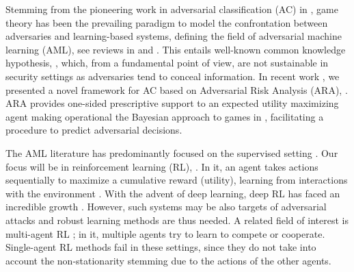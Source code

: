 Stemming from the pioneering work in adversarial classification (AC) in
\parencite{dalvi2004adversarial}, 
 game theory \parencite{menache2011network}
 has been the prevailing paradigm to model the confrontation
between adversaries and learning-based systems, 
defining the field of adversarial machine learning (AML),
 see reviews in 
\parencite{BIGGIO2018317} and \parencite{doi:10.1002/widm.1259}. This entails
well-known common
knowledge hypothesis, \parencite{hargreaves2004game}, which, from
a fundamental point of view, are  not sustainable in 
security settings 
as adversaries tend to %
conceal information. %
In recent work \parencite{naveiro2018adversarial}, we presented a novel 
framework for AC based on Adversarial Risk Analysis (ARA), \parencite{roponen}.
ARA provides one-sided prescriptive
support to an expected utility maximizing agent
 making operational the Bayesian approach to games in \parencite{kadane1982subjective, raiffa1982art}, facilitating a procedure to
predict adversarial decisions. 

The AML literature has predominantly focused on
the supervised setting \parencite{BIGGIO2018317}.
Our focus will be in reinforcement learning (RL), \parencite{sutton2012reinforcement}.
In it, an agent takes actions
sequentially to maximize a cumulative reward (utility), learning from
interactions with the environment \parencite{kaelbling1996reinforcement}. With the advent of deep learning, deep RL
has faced an incredible growth
\parencite{mnih2015human,silver2017mastering,chinorros}. 
However, such systems may be also targets of 
adversarial attacks \parencite{huang2017adversarial,lin2017tactics} 
and robust learning methods are thus
needed. 
A related field of interest is multi-agent RL \parencite{marl_over,leelee};
in it, multiple 
agents try to learn to compete or cooperate. Single-agent RL methods fail in
these settings, since they do not take into account 
the non-stationarity 
stemming due to the actions of the other agents. %

